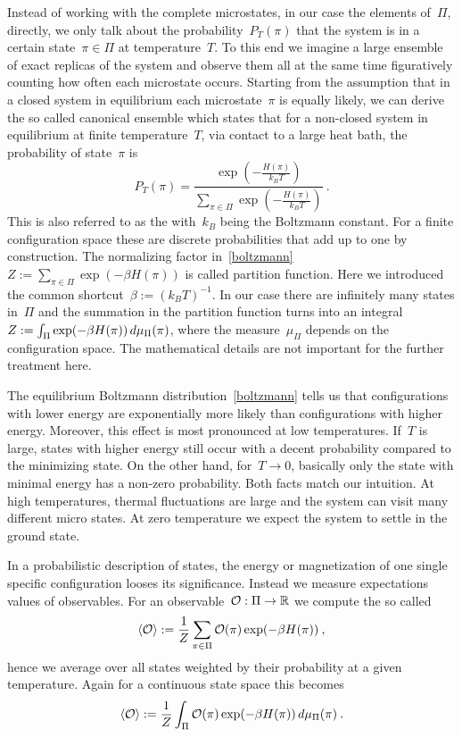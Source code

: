 Instead of working with the complete microstates, in our case the elements
of~$\Pi$, directly, we only talk about the probability~$P_{T}(\pi)$ that the
system is in a certain state~$\pi \in \Pi$ at temperature~$T$. To this end we
imagine a large ensemble of exact replicas of the system and observe them all at
the same time figuratively counting how often each microstate occurs. Starting
from the assumption that in a closed system in equilibrium each microstate~$\pi$
is equally likely, we can derive the so called canonical ensemble which states
that for a non-closed system in equilibrium at finite temperature~$T$, \eg{} via
contact to a large heat bath, the probability of state~$\pi$ is
%
\begin{equation}\label{boltzmann}
  P_{T}(\pi) = \frac{\exp \left(- \frac{H(\pi)}{k_B T}\right)}
  {\sum_{\pi \in \Pi} \exp \left(- \frac{H(\pi)}{k_B T}\right)}\:.
\end{equation}
%
This is also referred to as the 
with~$k_B$ being the Boltzmann constant. For a finite configuration space these
are discrete probabilities that add up to one by construction.  The normalizing
factor in~\eqref{boltzmann}~$Z := \sum_{\pi \in \Pi} \exp(-\beta H(\pi))$ is
called partition function. Here we introduced the common shortcut~$\beta :=
{(k_B T)}^{-1}$. In our case there are infinitely many states in~$\Pi$ and the
summation in the partition function turns into an integral~$Z := \int_{\Pi}
\exp(-\beta H(\pi)) \,d\mu_{\Pi}(\pi)$, where the measure~$\mu_{\Pi}$
depends on the configuration space. The mathematical details are not important
for the further treatment here.

The equilibrium Boltzmann distribution~\eqref{boltzmann} tells us that
configurations with lower energy are exponentially more likely than
configurations with higher energy. Moreover, this effect is most pronounced at
low temperatures. If~$T$ is large, states with higher energy still occur with a
decent probability compared to the minimizing state. On the other hand, for~$T
\to 0$, basically only the state with minimal energy has a non-zero probability.
Both facts match our intuition. At high temperatures, thermal fluctuations are
large and the system can visit many different micro states. At zero temperature
we expect the system to settle in the ground state.

In a probabilistic description of states, the energy or magnetization of one
single specific configuration looses its significance. Instead we measure
expectations values of observables. For an observable~${\mathcal{O}}:{\Pi}\to{\mathbb{R}}$ we
compute the so called 
%
\begin{equation}\label{thermavgsum}
  \langle \mathcal{O} \rangle := \frac{1}{Z} \sum_{\pi \in \Pi} \mathcal{O}(\pi) \exp(- \beta H(\pi))\:,
\end{equation}
%
hence we average over all states weighted by their probability at a given
temperature. Again for a continuous state space this becomes
%
\begin{equation}\label{thermavgint}
  \langle \mathcal{O} \rangle := \frac{1}{Z} \int_{\Pi} \mathcal{O}(\pi) \exp(- \beta H(\pi))
    \,d\mu_{\Pi}(\pi)\:.
\end{equation}
%


